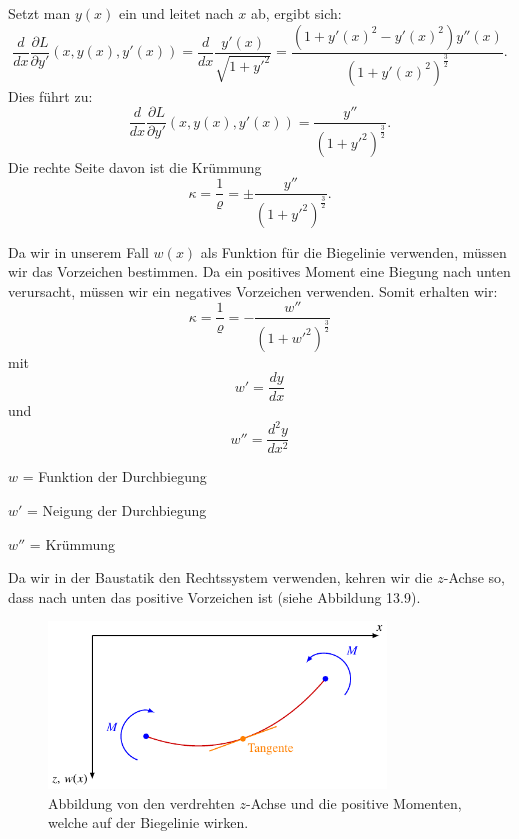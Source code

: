 Setzt man $y(x)$ ein und leitet nach $x$ ab, ergibt sich:
\begin{equation*}
	\frac{d}{dx} \frac{\partial L}{\partial y'}(x,y(x),y'(x)) = \frac{d}{dx} \frac{y'(x)}{\sqrt{1 + {y'}^2}} = \frac{(1 + {y'(x)}^2 - {y'(x)}^2) y''(x)}{(1 + {y'(x)}^2)^{\frac{3}{2}}}.
\end{equation*}
Dies führt zu:
\begin{equation*}
	\frac{d}{dx} \frac{\partial L}{\partial y'}(x,y(x),y'(x)) = \frac{y''}{(1 + {y'}^2)^{\frac{3}{2}}}.
\end{equation*}
Die rechte Seite davon ist die Krümmung
\begin{equation*}
	\kappa = \frac{1}{\varrho} = \pm \frac{y''}{(1 + {y'}^2)^{\frac{3}{2}}}.
\end{equation*}

Da wir in unserem Fall $w(x)$ als Funktion für die Biegelinie verwenden, müssen wir das Vorzeichen bestimmen. Da ein positives Moment eine Biegung nach unten verursacht, müssen wir ein negatives Vorzeichen verwenden. Somit erhalten wir:
\begin{equation*}
	\kappa=
	\frac{1}{\varrho}=
	-\frac{w''}{\left(1+{w'}^2\right)^\frac{3}{2}}
\end{equation*}
mit
\begin{equation*}
	w'=
	\frac{dy}{dx} 
\end{equation*}
und
\begin{equation*}
	w''=
	\frac{d^2y}{dx^2}
\end{equation*}

$w$ = Funktion der Durchbiegung

$w'$ = Neigung der Durchbiegung

$w''$ = Krümmung

Da wir in der Baustatik den Rechtssystem verwenden, kehren wir die $z$-Achse so, dass nach unten das positive Vorzeichen ist (siehe Abbildung 13.9).
\begin{figure}
\centering
	\includegraphics[width=0.8\textwidth]{papers/balken/images/teil2/BiegungverdrehteAchsen.pdf}
\caption{Abbildung von den verdrehten $z$-Achse und die positive Momenten, welche auf der Biegelinie wirken.}
\label{fig:Abbildung von den verdrehten $z$-Achse und die positive Momenten, welche auf der Biegelinie wirken.}
\end{figure}

